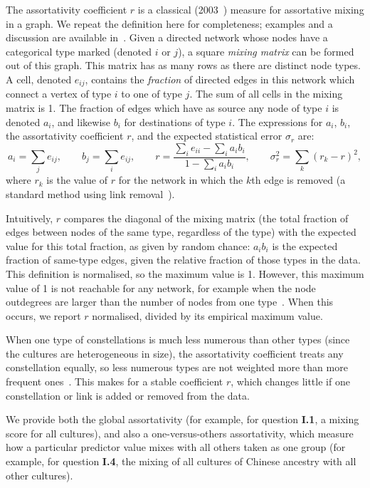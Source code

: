 \documentclass[10pt]{article}
\begin{document}
The assortativity coefficient $r$ is a classical (2003~\cite{PhysRevE.67.026126}) measure for assortative mixing in a graph. We repeat the definition here for completeness; examples and a discussion are available in~\cite{PhysRevE.67.026126,newman2018networks}. Given a directed network whose nodes have a categorical type marked (denoted $i$ or $j$), a square \emph{mixing matrix} can be formed out of this graph. This matrix has as many rows as there are distinct node types. A cell, denoted $e_{ij}$, contains the \emph{fraction} of directed edges in this network which connect a vertex of type $i$ to one of type $j$. The sum of all cells in the mixing matrix is 1. The fraction of edges which have as source any node of type $i$ is denoted $a_i$, and likewise $b_i$ for destinations of type $i$. The expressions for $a_i$, $b_i$, the assortativity coefficient $r$, and the expected statistical error $\sigma_r$ are:
\[
a_i = \sum_j e_{ij}, \qquad 
b_j = \sum_i e_{ij}, \qquad 
r = \dfrac{\sum_i e_{ii} - \sum_i a_i b_i}{1 - \sum_i a_i b_i}, \qquad 
\sigma_r^2 = \sum_k (r_k - r)^2,
\]
where $r_k$ is the value of $r$ for the network in which the $k$th edge is removed (a standard method using link removal~\cite{PhysRevE.67.026126}).

Intuitively, $r$ compares the diagonal of the mixing matrix (the total fraction of edges between nodes of the same type, regardless of the type) with the expected value for this total fraction, as given by random chance: $a_i b_i$ is the expected fraction of same-type edges, given the relative fraction of those types in the data. This definition is normalised, so the maximum value is 1. However, this maximum value of 1 is not reachable for any network, for example when the node outdegrees are larger than the number of nodes from one type~\cite{newman2018networks}. When this occurs, we report $r$ normalised, divided by its empirical maximum value. 

When one type of constellations is much less numerous than other types (since the cultures are heterogeneous in size), the assortativity coefficient treats any constellation equally, so less numerous types are not weighted more than more frequent ones~\cite{PhysRevE.67.026126}. This makes for a stable coefficient $r$, which changes little if one constellation or link is added or removed from the data.

We provide both the global assortativity (for example, for question {\bf I.1}, a mixing score for all cultures), and also a one-versus-others assortativity, which measure how a particular predictor value mixes with all others taken as one group (for example, for question {\bf I.4}, the mixing of all cultures of Chinese ancestry with all other cultures).
\end{document}
